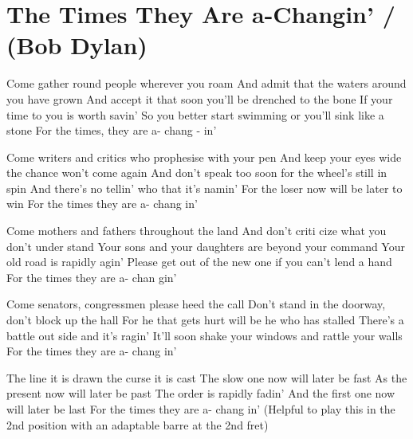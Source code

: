 \section{The Times They Are a-Changin' / (Bob Dylan)}\label{sec:the_times_they_are_a-changin_}


Come gather round people wherever you roam
And admit that the waters around you have 
grown
And accept it that soon you'll be drenched to
the bone
If your time to you is worth savin'
So you better start swimming or you'll sink like
a stone
For the times, they are a- chang - in'

Come writers and critics who prophesise with
your pen
And keep your eyes wide the chance won't come
again
And don't speak too soon for the wheel's still
in spin
And there's no tellin' who that it's namin'
For the loser now will be later to win
For the times they are a- chang in'

Come mothers and fathers throughout the 
land
And don't criti cize what you don't under 
stand
Your sons and your daughters are beyond your
command
Your old road is rapidly agin'
Please get out of the new one if you can't lend
a hand
For the times they are a- chan gin'

Come senators, congressmen please heed the 
call
Don't stand in the doorway, don't block up the
hall
For he that gets hurt will be he who has 
stalled
There's a battle out side and it's ragin'
It'll soon shake your windows and rattle your
walls
For the times they are a- chang in'

The line it is drawn the curse it is cast
The slow one now will later be fast
As the present now will later be past
The order is rapidly fadin'
And the first one now will later be last
For the times they are a- chang in'
{\small (Helpful to play this in the 2nd position with an adaptable barre at the
2nd fret)}
